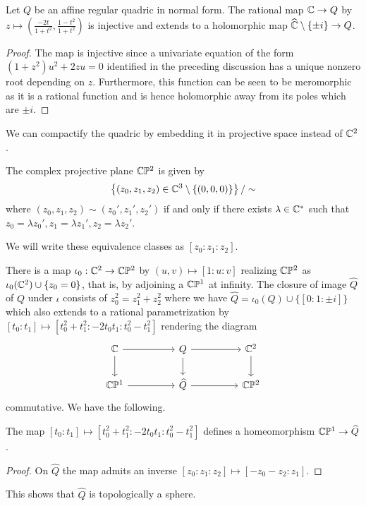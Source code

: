 \begin{proposition}\label{prop: injective on complement of pm i}
    Let $Q$ be an affine regular quadric in normal form. The rational map $\mathbb{C}\to Q$ by $z\mapsto\left(\frac{-2t}{1+t^{2}},\frac{1-t^{2}}{1+t^{2}}\right)$ is injective and extends to a holomorphic map $\widehat{\mathbb{C}}\setminus\{\pm i\}\to Q$. 
\end{proposition} 
\begin{proof}
    The map is injective since a univariate equation of the form $(1+z^{2})u^{2}+2zu=0$ identified in the preceding discussion has a unique nonzero root depending on $z$. Furthermore, this function can be seen to be meromorphic as it is a rational function and is hence holomorphic away from its poles which are $\pm i$. 
\end{proof}
We can compactify the quadric by embedding it in projective space instead of $\mathbb{C}^{2}$. 
\begin{definition}\label{def: complex projective plane}
    The complex projective plane $\mathbb{C}\mathbb{P}^{2}$ is given by 
    $$\left\{(z_{0},z_{1},z_{2})\in\mathbb{C}^{3}\setminus\{(0,0,0)\}\right\}/\sim$$
    where $(z_{0},z_{1},z_{2})\sim(z_{0}', z_{1}', z_{2}')$ if and only if there exists $\lambda\in\mathbb{C}^{*}$ such that $z_{0}=\lambda z_{0}', z_{1}=\lambda z_{1}', z_{2}=\lambda z_{2}'$. 
\end{definition}
We will write these equivalence classes as $[z_{0}:z_{1}:z_{2}]$. 

There is a map $\iota_{0}:\mathbb{C}^{2}\to\mathbb{C}\mathbb{P}^{2}$ by $(u,v)\mapsto[1:u:v]$ realizing $\mathbb{C}\mathbb{P}^{2}$ as $\iota_{0}(\mathbb{C}^{2})\cup\{z_{0}=0\}$, that is, by adjoining a $\mathbb{C}\mathbb{P}^{1}$ at infinity. The closure of image $\widehat{Q}$ of $Q$ under $\iota$ consists of $z_{0}^{2}=z_{1}^{2}+z_{2}^{2}$ where we have $\widehat{Q}=\iota_{0}(Q)\cup\{[0:1:\pm i]\}$ which also extends to a rational parametrization by $[t_{0}:t_{1}]\mapsto[t_{0}^{2}+t_{1}^{2}:-2t_{0}t_{1}:t_{0}^{2}-t_{1}^{2}]$ rendering the diagram 
$$%
\begin{tikzcd}
	\CC && Q && {\CC^{2}} \\
	{\CC\PP^{1}} && {\widehat{Q}} && {\CC\PP^{2}}
	\arrow[from=1-1, to=1-3]
	\arrow[from=1-1, to=2-1]
	\arrow[from=1-3, to=1-5]
	\arrow[from=1-3, to=2-3]
	\arrow[from=1-5, to=2-5]
	\arrow[from=2-1, to=2-3]
	\arrow[from=2-3, to=2-5]
\end{tikzcd}$$
commutative. We have the following. 
\begin{proposition}\label{prop: compactified quadric is homeomorphic to P1}
    The map $[t_{0}:t_{1}]\mapsto[t_{0}^{2}+t_{1}^{2}:-2t_{0}t_{1}:t_{0}^{2}-t_{1}^{2}]$ defines a homeomorphism $\mathbb{C}\mathbb{P}^{1}\to\widehat{Q}$.
\end{proposition}
\begin{proof}
    On $\widehat{Q}$ the map admits an inverse $[z_{0}:z_{1}:z_{2}]\mapsto [-z_{0}-z_{2}:z_{1}]$.  
\end{proof}
This shows that $\widehat{Q}$ is topologically a sphere. 

